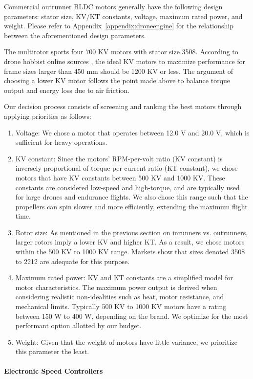 Commercial outrunner BLDC motors generally have the following design parameters: stator size, KV/KT constants, voltage, maximum rated power, and weight. Please refer to Appendix~\ref{appendix:droneengine} for the relationship between the aforementioned design parameters. 

The multirotor sports four 700 KV motors with stator size 3508.  According to drone hobbist online sources \cite{kv1, kv2}, the ideal KV motors to maximize performance for frame sizes larger than 450 mm should be 1200 KV or less. The argument of choosing a lower KV motor follows the point made above to balance torque output and energy loss due to air friction.

Our decision process consists of screening and ranking the best motors through applying priorities as follows:

\begin{enumerate}
    \item Voltage: We chose a motor that operates between 12.0 V and 20.0 V, which is sufficient for heavy operations.
    \item KV constant: Since the motors' RPM-per-volt ratio (KV constant) is inversely proportional of torque-per-current ratio (KT constant), we chose motors that have KV constants between 500 KV and 1000 KV. These constants are considered low-speed and high-torque, and are typically used for large drones and endurance flights. We also chose this range such that the propellers can spin slower and more efficiently, extending the maximum flight time.
    \item Rotor size: As mentioned in the previous section on inrunners vs. outrunners, larger rotors imply a lower KV and higher KT. As a result, we chose motors within the 500 KV to 1000 KV range. Markets show that sizes denoted 3508 to 2212 are adequate for this purpose.
    \item Maximum rated power: KV and KT constants are a simplified model for motor characteristics. The maximum power output is derived when considering realistic non-idealities such as heat, motor resistance, and mechanical limits. Typically 500 KV to 1000 KV motors have a rating between 150 W to 400 W, depending on the brand. We optimize for the most performant option allotted by our budget.
    \item Weight: Given that the weight of motors have little variance, we prioritize this parameter the least.
\end{enumerate}

\paragraph{Electronic Speed Controllers}

